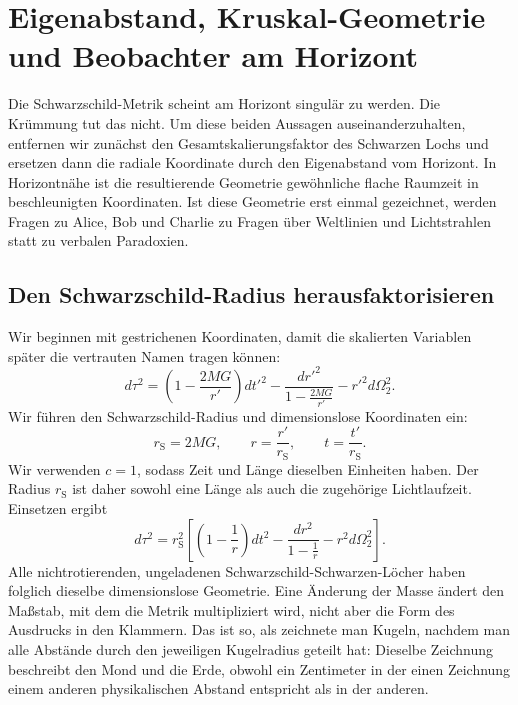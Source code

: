 \chapter{Eigenabstand, Kruskal-Geometrie und Beobachter am Horizont}

Die Schwarzschild-Metrik scheint am Horizont singulär zu werden. Die Krümmung tut das nicht. Um diese beiden Aussagen auseinanderzuhalten, entfernen wir zunächst den Gesamtskalierungsfaktor des Schwarzen Lochs und ersetzen dann die radiale Koordinate durch den Eigenabstand vom Horizont. In Horizontnähe ist die resultierende Geometrie gewöhnliche flache Raumzeit in beschleunigten Koordinaten. Ist diese Geometrie erst einmal gezeichnet, werden Fragen zu Alice, Bob und Charlie zu Fragen über Weltlinien und Lichtstrahlen statt zu verbalen Paradoxien.

\section{Den Schwarzschild-Radius herausfaktorisieren}

Wir beginnen mit gestrichenen Koordinaten, damit die skalierten Variablen später die vertrauten Namen tragen können:
\begin{equation}
d\tau^2
=
\left(1-\frac{2MG}{r'}\right)dt'^2
-
\frac{dr'^2}{1-\frac{2MG}{r'}}
-
r'^2d\Omega_2^2.
\label{eq:l7-schwarzschild-dimensional}
\end{equation}
Wir führen den Schwarzschild-Radius und dimensionslose Koordinaten ein:
\begin{equation}
r_{\mathrm S}=2MG,
\qquad
r=\frac{r'}{r_{\mathrm S}},
\qquad
t=\frac{t'}{r_{\mathrm S}}.
\label{eq:l7-rescaling}
\end{equation}
Wir verwenden \(c=1\), sodass Zeit und Länge dieselben Einheiten haben. Der Radius \(r_{\mathrm S}\) ist daher sowohl eine Länge als auch die zugehörige Lichtlaufzeit. Einsetzen ergibt
\begin{equation}
d\tau^2
=r_{\mathrm S}^2
\left[
\left(1-\frac1r\right)dt^2
-
\frac{dr^2}{1-\frac1r}
-
r^2d\Omega_2^2
\right].
\label{eq:l7-schwarzschild-rescaled}
\end{equation}
Alle nichtrotierenden, ungeladenen Schwarzschild-Schwarzen-Löcher haben folglich dieselbe dimensionslose Geometrie. Eine Änderung der Masse ändert den Maßstab, mit dem die Metrik multipliziert wird, nicht aber die Form des Ausdrucks in den Klammern. Das ist so, als zeichnete man Kugeln, nachdem man alle Abstände durch den jeweiligen Kugelradius geteilt hat: Dieselbe Zeichnung beschreibt den Mond und die Erde, obwohl ein Zentimeter in der einen Zeichnung einem anderen physikalischen Abstand entspricht als in der anderen.

